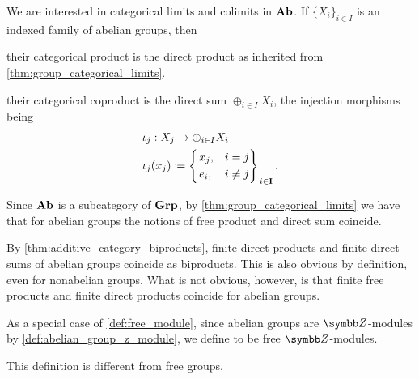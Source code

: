 \begin{proposition}\label{thm:abelian_group_categorical_limits}
  We are interested in categorical limits and colimits in \( \operatorname{\mathbf{Ab}} \). If \( \{ X_i \}_{i \in I} \) is an indexed family of abelian groups, then
  \begin{defenum}
    \item\label{thm:abelian_group_categorical_limits/product} their categorical product is the direct product as inherited from \cref{thm:group_categorical_limits}.

    \item\label{thm:abelian_group_categorical_limits/coproduct} their categorical coproduct is the direct sum \( \oplus_{i \in I} X_i \), the injection morphisms being
    \begin{align*}
      &\iota_j: X_j \to \oplus_{i \in I} X_i \\
      &\iota_j(x_j) \coloneqq \begin{dcases}
        \begin{drcases}
          x_j, &i = j \\
          e_i, &i \neq j
        \end{drcases}
      \end{dcases}_{i \in \Bold I}.
    \end{align*}

    Since \( \operatorname{\mathbf{Ab}} \) is a subcategory of \( \operatorname{\mathbf{Grp}} \), by \cref{thm:group_categorical_limits} we have that for abelian groups the notions of free product and direct sum coincide.
  \end{defenum}
\end{proposition}

\begin{note}\label{note:abelian_group_biproducts}
  By \cref{thm:additive_category_biproducts}, finite direct products and finite direct sums of abelian groups coincide as biproducts. This is also obvious by definition, even for nonabelian groups. What is not obvious, however, is that finite free products and finite direct products coincide for abelian groups.
\end{note}

\begin{definition}\label{def:free_abelian_group}
  As a special case of \cref{def:free_module}, since abelian groups are \( \BB{Z} \)-modules by \cref{def:abelian_group_z_module}, we define  to be free \( \BB{Z} \)-modules.

  This definition is different from free groups.
\end{definition}
